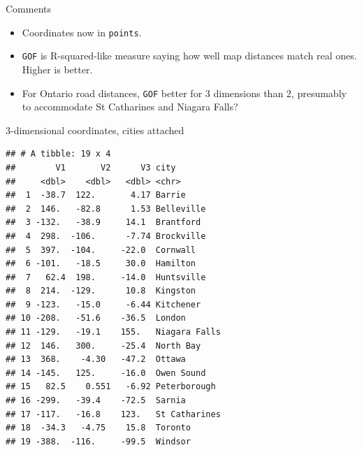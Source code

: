 \documentclass[ignorenonframetext,]{beamer}
\newenvironment{Shaded}{\begin{snugshade}}{\end{snugshade}}
\newcommand{\DataTypeTok}[1]{\textcolor[rgb]{0.13,0.29,0.53}{#1}}
\newcommand{\FloatTok}[1]{\textcolor[rgb]{0.00,0.00,0.81}{#1}}
\newcommand{\KeywordTok}[1]{\textcolor[rgb]{0.13,0.29,0.53}{\textbf{#1}}}
\newcommand{\NormalTok}[1]{#1}
\newcommand{\OperatorTok}[1]{\textcolor[rgb]{0.81,0.36,0.00}{\textbf{#1}}}
\newcommand{\StringTok}[1]{\textcolor[rgb]{0.31,0.60,0.02}{#1}}
\begin{document}
\begin{frame}[fragile]{Comments}
\protect\hypertarget{comments-23}{}

\begin{itemize}
\item
  Coordinates now in \texttt{points}.
\item
  \texttt{GOF} is R-squared-like measure saying how well map distances
  match real ones. Higher is better.
\item
  For Ontario road distances, \texttt{GOF} better for 3 dimensions than
  2, presumably to accommodate St Catharines and Niagara Falls?
\end{itemize}

\end{frame}

\begin{frame}[fragile]{3-dimensional coordinates, cities attached}
\protect\hypertarget{dimensional-coordinates-cities-attached}{}

\begin{Shaded}
\end{Shaded}

\begin{verbatim}
## # A tibble: 19 x 4
##        V1       V2      V3 city         
##     <dbl>    <dbl>   <dbl> <chr>        
##  1  -38.7  122.       4.17 Barrie       
##  2  146.   -82.8      1.53 Belleville   
##  3 -132.   -38.9     14.1  Brantford    
##  4  298.  -106.      -7.74 Brockville   
##  5  397.  -104.     -22.0  Cornwall     
##  6 -101.   -18.5     30.0  Hamilton     
##  7   62.4  198.     -14.0  Huntsville   
##  8  214.  -129.      10.8  Kingston     
##  9 -123.   -15.0     -6.44 Kitchener    
## 10 -208.   -51.6    -36.5  London       
## 11 -129.   -19.1    155.   Niagara Falls
## 12  146.   300.     -25.4  North Bay    
## 13  368.    -4.30   -47.2  Ottawa       
## 14 -145.   125.     -16.0  Owen Sound   
## 15   82.5    0.551   -6.92 Peterborough 
## 16 -299.   -39.4    -72.5  Sarnia       
## 17 -117.   -16.8    123.   St Catharines
## 18  -34.3   -4.75    15.8  Toronto      
## 19 -388.  -116.     -99.5  Windsor
\end{verbatim}

\end{frame}
\end{document}
